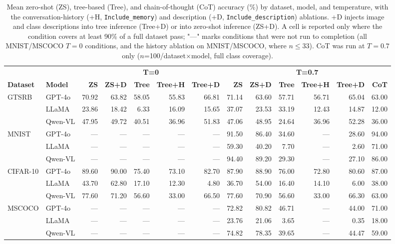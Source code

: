 \begin{table}[ht]
\centering
\caption{Mean zero-shot (ZS), tree-based (Tree), and chain-of-thought (CoT) accuracy (\%) by dataset, model, and temperature, with the conversation-history (+H, \texttt{Include\_memory}) and description (+D, \texttt{Include\_description}) ablations. +D injects image and class descriptions into tree inference (Tree+D) or into zero-shot inference (ZS+D). A cell is reported only where the condition covers at least 90\% of a full dataset pass; "---" marks conditions that were not run to completion (all MNIST/MSCOCO $T{=}0$ conditions, and the history ablation on MNIST/MSCOCO, where $n \leq 33$). CoT was run at $T{=}0.7$ only ($n$=100/dataset$\times$model, full class coverage).}
\footnotesize
\begin{tabular}{llrrrrrrrrrrr}
\hline
& & \multicolumn{5}{c}{\textbf{T=0}} & \multicolumn{6}{c}{\textbf{T=0.7}} \\
\textbf{Dataset} & \textbf{Model} & \textbf{ZS} & \textbf{ZS+D} & \textbf{Tree} & \textbf{Tree+H} & \textbf{Tree+D} & \textbf{ZS} & \textbf{ZS+D} & \textbf{Tree} & \textbf{Tree+H} & \textbf{Tree+D} & \textbf{CoT} \\ \hline
GTSRB     & GPT-4o   &  70.92 &  63.82 &  58.05 &  55.83 &  66.81 &  71.14 &  63.60 &  57.71 &  56.71 &  65.04 &  63.00 \\
          & LLaMA    &  23.86 &  18.42 &   6.33 &  16.09 &  15.65 &  37.07 &  23.53 &  33.19 &  12.43 &  14.87 &  12.00 \\
          & Qwen-VL  &  47.95 &  49.72 &  40.51 &  36.96 &  51.83 &  47.06 &  48.95 &  24.64 &  36.96 &  52.28 &  36.00 \\
\hline
MNIST     & GPT-4o   &    --- &    --- &    --- &    --- &    --- &  91.50 &  86.40 &  34.60 &    --- &  28.60 &  94.00 \\
          & LLaMA    &    --- &    --- &    --- &    --- &    --- &  59.30 &  40.20 &   7.70 &    --- &   2.60 &  71.00 \\
          & Qwen-VL  &    --- &    --- &    --- &    --- &    --- &  94.40 &  89.20 &  29.30 &    --- &  27.10 &  86.00 \\
\hline
CIFAR-10  & GPT-4o   &  89.60 &  90.00 &  75.40 &  73.10 &  82.70 &  87.90 &  88.90 &  76.00 &  72.80 &  80.60 &  87.00 \\
          & LLaMA    &  43.70 &  62.80 &  17.10 &  12.30 &   4.80 &  36.70 &  54.00 &  16.40 &  14.10 &   6.00 &  38.00 \\
          & Qwen-VL  &  77.60 &  71.20 &  56.60 &  33.00 &  66.50 &  77.60 &  70.90 &  56.60 &  33.00 &  66.30 &  63.00 \\
\hline
MSCOCO    & GPT-4o   &    --- &    --- &    --- &    --- &    --- &  72.82 &  80.82 &  46.71 &    --- &  44.00 &  71.00 \\
          & LLaMA    &    --- &    --- &    --- &    --- &    --- &  23.76 &  21.06 &   3.65 &    --- &   0.35 &  18.00 \\
          & Qwen-VL  &    --- &    --- &    --- &    --- &    --- &  74.82 &  78.35 &  39.65 &    --- &  44.47 &  59.00 \\
\hline
\end{tabular}
\label{tab:zs_vs_tree}
\end{table}
